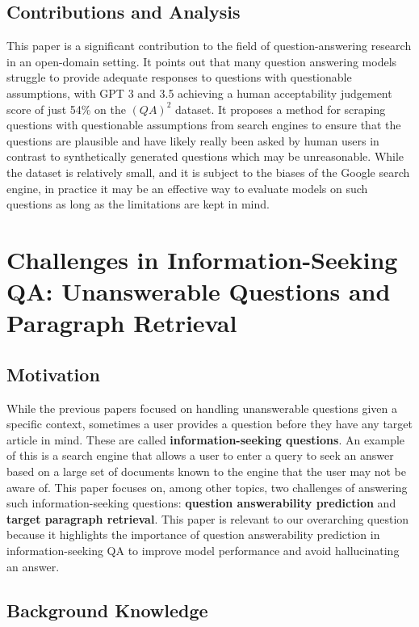 \documentclass[letterpaper, 11pt]{article}
\begin{document}
\subsection{Contributions and Analysis}
This paper is a significant contribution to the field of question-answering research in an open-domain setting. It points out that many question answering models struggle to provide adequate responses to questions with questionable assumptions, with GPT 3 and 3.5 achieving a human acceptability judgement score of just 54\% on the $(QA)^2$ dataset.
It proposes a method for scraping questions with questionable assumptions from search engines to ensure that the questions are plausible and have likely really been asked by human users 
in contrast to synthetically generated questions which may be unreasonable. While the dataset is relatively small, and it is subject to the biases of the Google search engine, in practice it may be an effective way to evaluate models on such questions as long as the limitations are kept in mind.

\section{Challenges in Information-Seeking QA: Unanswerable Questions and Paragraph Retrieval}
\label{subsec:challenges-in-information-seeking-qa-unanswerable-questions-and-paragraph-retrieval}

\subsection{Motivation}
While the previous papers focused on handling unanswerable questions given a specific context, sometimes a user provides a question before they have any target article in mind. These are called \textbf{information-seeking questions}. An example of this is a search engine that allows a user to enter a query
to seek an answer based on a large set of documents known to the engine that the user may not be aware of. 
This paper \citep{informationseeking} focuses on, among other topics, two challenges of answering such information-seeking questions: \textbf{question answerability prediction} and \textbf{target paragraph retrieval}.
This paper is relevant to our overarching question because it highlights the importance of question answerability prediction in information-seeking QA to improve model performance and avoid hallucinating an answer.

\subsection{Background Knowledge}
\end{document}

